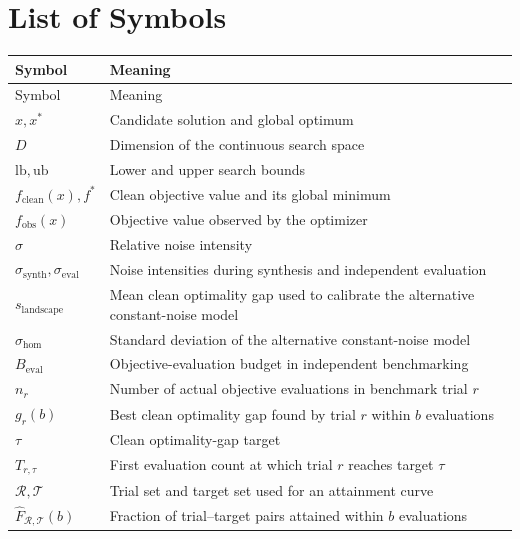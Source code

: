 
\chapter{List of Symbols}\label{chap:symbols}

\begin{longtable}{L{4.2cm}L{9.8cm}}
    \toprule
    Symbol & Meaning \\
    \midrule
    \endfirsthead
    \toprule
    Symbol & Meaning \\
    \midrule
    \endhead
    $x, x^*$ & Candidate solution and global optimum \\
    $D$ & Dimension of the continuous search space \\
    $\mathrm{lb},\mathrm{ub}$ & Lower and upper search bounds \\
    $f_{\mathrm{clean}}(x), f^*$ & Clean objective value and its global minimum \\
    $f_{\mathrm{obs}}(x)$ & Objective value observed by the optimizer \\
    $\sigma$ & Relative noise intensity \\
    $\sigma_{\mathrm{synth}},\sigma_{\mathrm{eval}}$ & Noise intensities during synthesis and independent evaluation \\
    $s_{\mathrm{landscape}}$ & Mean clean optimality gap used to calibrate the alternative constant-noise model \\
    $\sigma_{\mathrm{hom}}$ & Standard deviation of the alternative constant-noise model \\
    $B_{\mathrm{eval}}$ & Objective-evaluation budget in independent benchmarking \\
    $n_r$ & Number of actual objective evaluations in benchmark trial $r$ \\
    $g_r(b)$ & Best clean optimality gap found by trial $r$ within $b$ evaluations \\
    $\tau$ & Clean optimality-gap target \\
    $T_{r,\tau}$ & First evaluation count at which trial $r$ reaches target $\tau$ \\
    $\mathcal{R},\mathcal{T}$ & Trial set and target set used for an attainment curve \\
    $\widehat F_{\mathcal R,\mathcal T}(b)$ & Fraction of trial--target pairs attained within $b$ evaluations \\
    \bottomrule
\end{longtable}
